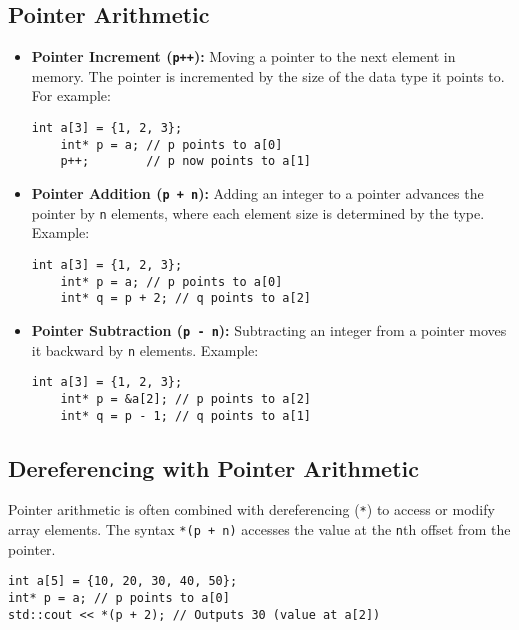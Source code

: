 \subsection{Pointer Arithmetic}
\begin{itemize}
    \item \textbf{Pointer Increment (\texttt{p++}):} 
    Moving a pointer to the next element in memory. The pointer is incremented by the size of the data type it points to. For example:
    \begin{lstlisting}[style=codeexpert]
    int a[3] = {1, 2, 3};
    int* p = a; // p points to a[0]
    p++;        // p now points to a[1]
    \end{lstlisting}

    \item \textbf{Pointer Addition (\texttt{p + n}):}
    Adding an integer to a pointer advances the pointer by \texttt{n} elements, where each element size is determined by the type. Example:
    \begin{lstlisting}[style=codeexpert]
    int a[3] = {1, 2, 3};
    int* p = a; // p points to a[0]
    int* q = p + 2; // q points to a[2]
    \end{lstlisting}

    \item \textbf{Pointer Subtraction (\texttt{p - n}):}
    Subtracting an integer from a pointer moves it backward by \texttt{n} elements. Example:
    \begin{lstlisting}[style=codeexpert]
    int a[3] = {1, 2, 3};
    int* p = &a[2]; // p points to a[2]
    int* q = p - 1; // q points to a[1]
    \end{lstlisting}

\end{itemize}

\subsection{Dereferencing with Pointer Arithmetic}
Pointer arithmetic is often combined with dereferencing (\texttt{*}) to access or modify array elements. The syntax \texttt{*(p + n)} accesses the value at the \texttt{n}th offset from the pointer.

\begin{lstlisting}[style=codeexpert]
int a[5] = {10, 20, 30, 40, 50};
int* p = a; // p points to a[0]
std::cout << *(p + 2); // Outputs 30 (value at a[2])
\end{lstlisting}

